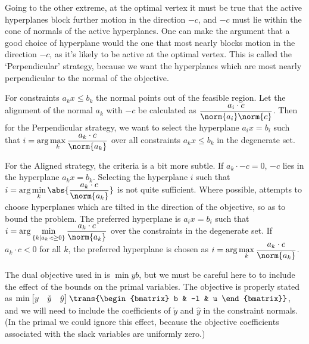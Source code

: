Going to the other extreme, at the optimal vertex it must be true that the
active
hyperplanes block further motion in the direction $-c$, and $-c$ must lie
within the cone of normals of the active hyperplanes.
One can make the argument that a good choice of hyperplane would the one that
most nearly blocks motion in the direction $-c$, as it's likely to be active
at the optimal vertex.
This is called the `Perpendicular' strategy, because we want the hyperplanes
which are most nearly perpendicular to the normal of the objective.

For constraints $a_k x \leq b_k$ the normal points out of the feasible region.
Let the alignment of the normal $a_k$ with $-c$ be calculated as
$\displaystyle \frac{a_i \cdot c}{\norm{a_i}\norm{c}}$.
Then for the Perpendicular strategy, we want to select the hyperplane
$a_i x = b_i$
such that $\displaystyle i = \arg \max_k \frac{a_k \cdot c}{\norm{a_k}}$ over
all constraints $a_k x \leq b_k$ in the degenerate set.

For the Aligned strategy, the criteria is a bit more subtle.
If $a_k \cdot -c = 0$, $-c$ lies in the hyperplane $a_k x = b_k$.
Selecting the hyperplane $i$ such that
$\displaystyle i = \arg \min_k \abs{\frac{a_k \cdot c}{\norm{a_k}}}$
is not quite sufficient.
Where possible, \dylp attempts to choose hyperplanes which are tilted in the
direction of the objective, so as to bound the problem.
The preferred hyperplane is $a_i x = b_i$ such that
$\displaystyle i = \arg 
  \min_{\{k \mid a_k \cdot c \geq 0\}} \frac{a_k \cdot c}{\norm{a_k}}$
over the constraints in the degenerate set.
If $a_k \cdot c < 0$ for all $k$, the preferred hyperplane is chosen as
$\displaystyle i = \arg \max_k \frac{a_k \cdot c}{\norm{a_k}}$.

The dual objective used in \dylp is $\min yb$, but we must be careful here to
to include the effect of the bounds on the primal variables.
The objective is properly stated as
$\min \begin{bmatrix} y & \check{y} & \hat{y} \end{bmatrix}
\trans{\begin{bmatrix} b & -l & u \end{bmatrix}}$,
and we will need to include the
coefficients of $\check{y}$ and $\hat{y}$ in the constraint normals.
(In the primal we could ignore this effect, because the objective coefficients
associated with the slack variables are uniformly zero.)

